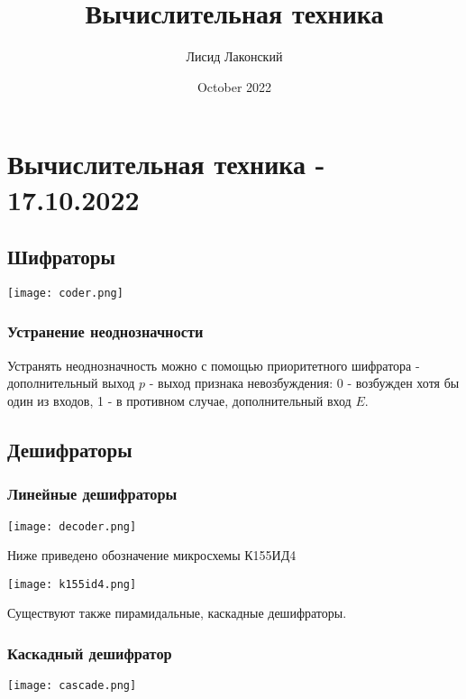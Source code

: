 \documentclass{article}
\title{Вычислительная техника}
\author{Лисид Лаконский}
\date{October 2022}
\begin{document}
\maketitle
\tableofcontents
\pagebreak

\section{Вычислительная техника - 17.10.2022}

\subsection{Шифраторы}

\begin{flushleft}

\texttt{[image: coder.png]}

\subsubsection{Устранение неоднозначности}

Устранять неоднозначность можно с помощью приоритетного шифратора - дополнительный выход $p$ - выход признака невозбуждения: 0 - возбужден хотя бы один из входов, 1 - в противном случае, дополнительный вход $E$.

\subsection{Дешифраторы}

\subsubsection{Линейные дешифраторы}

\texttt{[image: decoder.png]}

\hfill

Ниже приведено обозначение микросхемы К155ИД4

\hfill

\texttt{[image: k155id4.png]}

Существуют также пирамидальные, каскадные дешифраторы.

\subsubsection{Каскадный дешифратор}

\texttt{[image: cascade.png]}


\end{flushleft}
\end{document}
